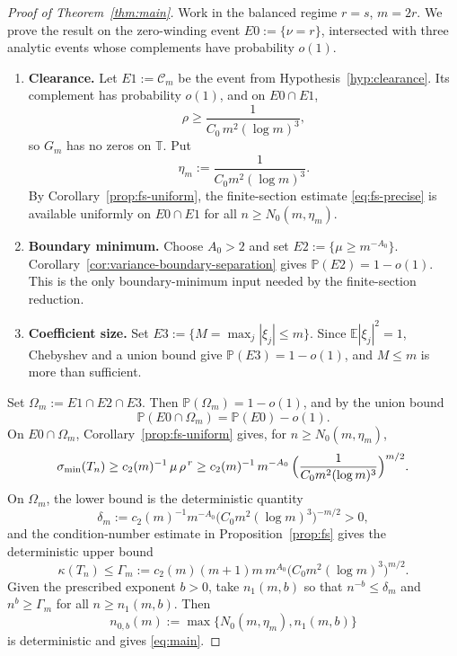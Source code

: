 \documentclass[11pt]{amsart}
\numberwithin{equation}{section}
\theoremstyle{definition}
\theoremstyle{remark}
\newcommand{\T}{\mathbb T}
\newcommand{\Prob}{\mathbb P}
\newcommand{\Exp}{\mathbb E}
\newcommand{\smin}{\sigma_{\min}}
\newcommand{\kdn}{\kappa}
\newcommand{\abs}[1]{\left\lvert #1\right\rvert}
\begin{document}
\begin{proof}[Proof of Theorem~\ref{thm:main}]
Work in the balanced regime $r=s$, $m=2r$. We prove the result on the zero-winding event \(E0:=\{\nu=r\}\), intersected with three analytic events whose complements have probability \(o(1)\).
\begin{enumerate}[label=(E\arabic*)]
\item \textbf{Clearance.} Let \(E1:=\mathcal C_m\) be the event from Hypothesis~\ref{hyp:clearance}.  Its complement has probability \(o(1)\), and on \(E0\cap E1\),
\[
  \rho\ge\frac{1}{C_0\,m^2(\log m)^3},
\]
so \(G_m\) has no zeros on \(\T\).  Put
\[
  \eta_m:=\frac{1}{C_0m^2(\log m)^3}.
\]
By Corollary~\ref{prop:fs-uniform}, the finite-section estimate
\eqref{eq:fs-precise} is available uniformly on \(E0\cap E1\) for all
\(n\ge N_0(m,\eta_m)\).
\item \textbf{Boundary minimum.} Choose \(A_0>2\) and set
\(E2:=\{\mu\ge m^{-A_0}\}\).  Corollary~\ref{cor:variance-boundary-separation}
gives \(\Prob(E2)=1-o(1)\).  This is the only boundary-minimum input needed by
the finite-section reduction.
\item \textbf{Coefficient size.} Set \(E3:=\{M=\max_j\abs{\xi_j}\le m\}\). Since \(\Exp\abs{\xi_j}^2=1\), Chebyshev and a union bound give \(\Prob(E3)=1-o(1)\), and \(M\le m\) is more than sufficient.
\end{enumerate}
Set \(\Omega_m:=E1\cap E2\cap E3\). Then \(\Prob(\Omega_m)=1-o(1)\), and by the union bound
\[
  \Prob(E0\cap\Omega_m)=\Prob(E0)-o(1).
\]
On \(E0\cap\Omega_m\), Corollary~\ref{prop:fs-uniform} gives, for
$n\ge N_0(m,\eta_m)$,
\[
  \smin(T_n)\ge c_2(m)^{-1}\,\mu\,\rho^{\,r}
  \ge c_2(m)^{-1}\,m^{-A_0}\,\Bigl(\frac{1}{C_0m^2(\log m)^3}\Bigr)^{m/2}.
\]
On \(\Omega_m\), the lower bound is the deterministic quantity
\[
  \delta_m:=c_2(m)^{-1}m^{-A_0}\bigl(C_0m^2(\log m)^3\bigr)^{-m/2}>0,
\]
and the condition-number estimate in Proposition~\ref{prop:fs} gives the deterministic upper bound
\[
  \kdn(T_n)\le
  \Gamma_m:=c_2(m)(m+1)m\,m^{A_0}\bigl(C_0m^2(\log m)^3\bigr)^{m/2}.
\]
Given the prescribed exponent \(b>0\), take \(n_1(m,b)\) so that
\(n^{-b}\le\delta_m\) and \(n^b\ge\Gamma_m\) for all \(n\ge n_1(m,b)\).  Then
\[
  n_{0,b}(m):=\max\{N_0(m,\eta_m),n_1(m,b)\}
\]
is deterministic and gives \eqref{eq:main}.
\end{proof}
\end{document}
